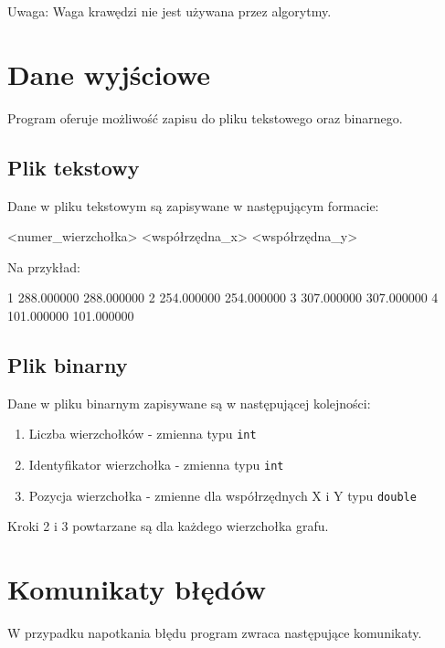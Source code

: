 \documentclass[]{article}
\begin{document}
	Uwaga: Waga krawędzi nie jest używana przez algorytmy.
	\section{Dane wyjściowe}
	Program oferuje możliwość zapisu do pliku tekstowego oraz binarnego. 
	
	\subsection{Plik tekstowy}
	Dane w pliku tekstowym są zapisywane w następującym formacie:
	\begin{mylisting}
<numer_wierzchołka> <współrzędna_x> <współrzędna_y>
	\end{mylisting}
	Na przykład:
	\begin{mylisting}
1 288.000000 288.000000
2 254.000000 254.000000
3 307.000000 307.000000
4 101.000000 101.000000
	\end{mylisting}
	\clearpage
	\subsection{Plik binarny}
	Dane w pliku binarnym zapisywane są w następującej kolejności:
	\begin{enumerate}
		\item Liczba wierzchołków - zmienna typu \texttt{int}
		\item Identyfikator wierzchołka - zmienna typu \texttt{int}
		\item Pozycja wierzchołka - zmienne dla współrzędnych X i Y typu \texttt{double}
	\end{enumerate}
	Kroki 2 i 3 powtarzane są dla każdego wierzchołka grafu.
	\section{Komunikaty błędów}
	W przypadku napotkania błędu program zwraca następujące komunikaty.
\end{document}

